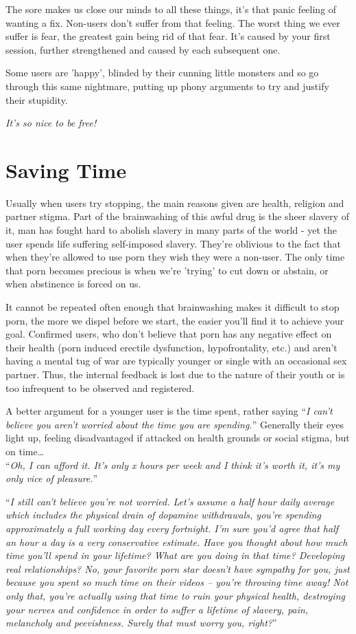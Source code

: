 \documentclass[
]{book}
\begin{document}
The sore makes us close our minds to all these things, it's that panic feeling of wanting a fix. Non-users don't suffer from that feeling. The worst thing we ever suffer is fear, the greatest gain being rid of that fear. It's caused by your first session, further strengthened and caused by each subsequent one.

Some users are 'happy', blinded by their cunning little monsters and so go through this same nightmare, putting up phony arguments to try and justify their stupidity.

\emph{It's so nice to be free!}

\hypertarget{saving-time}{%
\chapter{Saving Time}\label{saving-time}}

Usually when users try stopping, the main reasons given are health, religion and partner stigma. Part of the brainwashing of this awful drug is the sheer slavery of it, man has fought hard to abolish slavery in many parts of the world - yet the user spends life suffering self-imposed slavery. They're oblivious to the fact that when they're allowed to use porn they wish they were a non-user. The only time that porn becomes precious is when we're 'trying' to cut down or abstain, or when abstinence is forced on us.

It cannot be repeated often enough that brainwashing makes it difficult to stop porn, the more we dispel before we start, the easier you'll find it to achieve your goal. Confirmed users, who don't believe that porn has any negative effect on their health (porn induced erectile dysfunction, hypofrontality, etc.) and aren't having a mental tug of war are typically younger or single with an occasional sex partner. Thus, the internal feedback is lost due to the nature of their youth or is too infrequent to be observed and registered.

A better argument for a younger user is the time spent, rather saying ``\emph{I can't believe you aren't worried about the time you are spending.}'' Generally their eyes light up, feeling disadvantaged if attacked on health grounds or social stigma, but on time\ldots{}\\
``\emph{Oh, I can afford it. It's only x hours per week and I think it's worth it, it's my only vice of pleasure.}''

``\emph{I still can't believe you're not worried. Let's assume a half hour daily average which includes the physical drain of dopamine withdrawals, you're spending approximately a full working day every fortnight. I'm sure you'd agree that half an hour a day is a very conservative estimate. Have you thought about how much time you'll spend in your lifetime? What are you doing in that time? Developing real relationships? No, your favorite porn star doesn't have sympathy for you, just because you spent so much time on their videos -- you're throwing time away! Not only that, you're actually using that time to ruin your physical health, destroying your nerves and confidence in order to suffer a lifetime of slavery, pain, melancholy and peevishness. Surely that must worry you, right?}''
\end{document}
